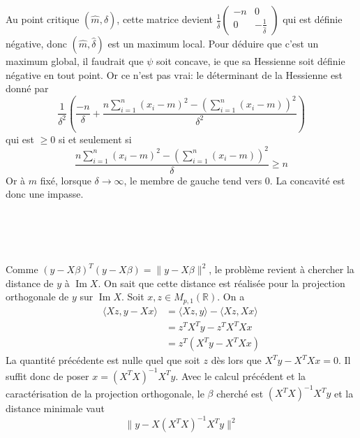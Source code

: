 \documentclass{report}
\DeclareMathOperator{\im}{Im}
\begin{document}
Au point critique $(\hat m, \hat \delta)$, cette matrice devient $\frac{1}{\hat \delta} \begin{pmatrix}
-n & 0 \\
0 & -\frac{1}{\hat \delta}
\end{pmatrix}$ qui est définie négative, donc $(\hat m, \hat \delta)$ est un maximum local. \newline
Pour déduire que c'est un maximum global, il faudrait que $\psi$ soit concave, ie que sa Hessienne soit définie négative en tout point. Or ce n'est pas vrai: le déterminant de la Hessienne est donné par $$\frac{1}{\delta^2}\left(\frac{-n}{\delta} + \frac{n \sum_{i=1}^n (x_i-m)^2 - \left(\sum_{i=1}^n(x_i-m) \right)^2}{\delta^2}\right)$$ qui est $\geq 0$ si et seulement si $$\frac{n \sum_{i=1}^n (x_i-m)^2 - \left(\sum_{i=1}^n(x_i-m) \right)^2}{\delta}\geq n$$
Or à $m$ fixé, lorsque $\delta \to \infty$, le membre de gauche tend vers $0$.\newline
\newline
La concavité est donc une impasse.



\subsection{} \noindent{}\\ 
\\ 
\\
\noindent Comme $(y-X\beta)^T(y-X\beta)= \|y-X\beta\|^2$, le problème revient à chercher la distance de $y$ à $\im X$.\newline
On sait que cette distance est réalisée pour la projection orthogonale de $y$ sur $\im X$. Soit $x,z \in M_{p,1}(\mathbb R)$. On a 
$$\begin{aligned}
\langle Xz, y - Xx \rangle &= \langle Xz,y \rangle - \langle Xz,Xx \rangle \\
&= z^TX^Ty - z^TX^TXx\\ 
&= z^T(X^Ty - X^TXx)
\end{aligned}$$
La quantité précédente est nulle quel que soit $z$ dès lors que $X^Ty - X^TXx=0$. Il suffit donc de poser $x=(X^TX)^{-1}X^Ty$.\newline
Avec le calcul précédent et la caractérisation de la projection orthogonale, le $\beta$ cherché est $(X^TX)^{-1}X^Ty$ et la distance minimale vaut $$\|y-X(X^TX)^{-1}X^Ty\|^2$$
\end{document}
